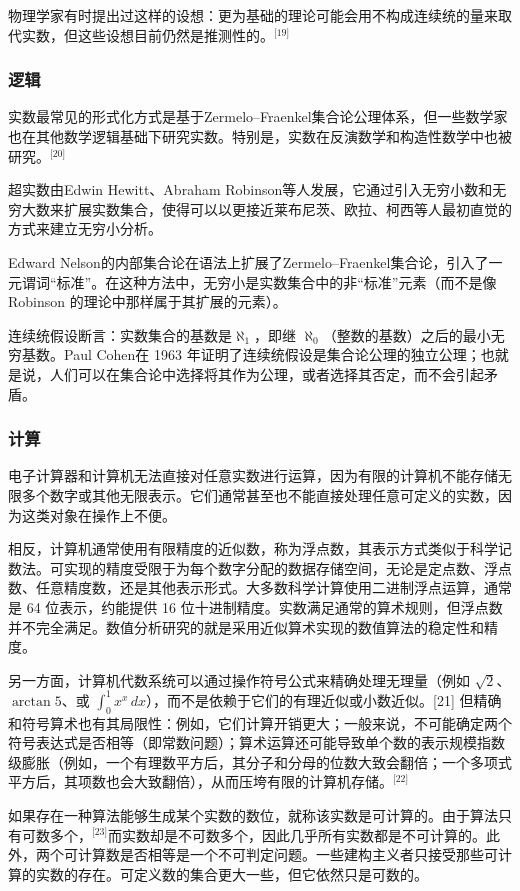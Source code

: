 物理学家有时提出过这样的设想：更为基础的理论可能会用不构成连续统的量来取代实数，但这些设想目前仍然是推测性的。\(^\text{[19]}\)
\subsubsection{逻辑}
实数最常见的形式化方式是基于Zermelo–Fraenkel集合论公理体系，但一些数学家也在其他数学逻辑基础下研究实数。特别是，实数在反演数学和构造性数学中也被研究。\(^\text{[20]}\)

超实数由Edwin Hewitt、Abraham Robinson等人发展，它通过引入无穷小数和无穷大数来扩展实数集合，使得可以以更接近莱布尼茨、欧拉、柯西等人最初直觉的方式来建立无穷小分析。

Edward Nelson的内部集合论在语法上扩展了Zermelo–Fraenkel集合论，引入了一元谓词“标准”。在这种方法中，无穷小是实数集合中的非“标准”元素（而不是像 Robinson 的理论中那样属于其扩展的元素）。

连续统假设断言：实数集合的基数是$\aleph_{1}$，即继 $\aleph_{0}$（整数的基数）之后的最小无穷基数。Paul Cohen在 1963 年证明了连续统假设是集合论公理的独立公理；也就是说，人们可以在集合论中选择将其作为公理，或者选择其否定，而不会引起矛盾。
\subsubsection{计算}
电子计算器和计算机无法直接对任意实数进行运算，因为有限的计算机不能存储无限多个数字或其他无限表示。它们通常甚至也不能直接处理任意可定义的实数，因为这类对象在操作上不便。

相反，计算机通常使用有限精度的近似数，称为浮点数，其表示方式类似于科学记数法。可实现的精度受限于为每个数字分配的数据存储空间，无论是定点数、浮点数、任意精度数，还是其他表示形式。大多数科学计算使用二进制浮点运算，通常是 64 位表示，约能提供 16 位十进制精度。实数满足通常的算术规则，但浮点数并不完全满足。数值分析研究的就是采用近似算术实现的数值算法的稳定性和精度。

另一方面，计算机代数系统可以通过操作符号公式来精确处理无理量（例如 $\sqrt{2}$、$\arctan 5$、或 $\int_{0}^{1} x^{x}\, dx$），而不是依赖于它们的有理近似或小数近似。[21] 但精确和符号算术也有其局限性：例如，它们计算开销更大；一般来说，不可能确定两个符号表达式是否相等（即常数问题）；算术运算还可能导致单个数的表示规模指数级膨胀（例如，一个有理数平方后，其分子和分母的位数大致会翻倍；一个多项式平方后，其项数也会大致翻倍），从而压垮有限的计算机存储。\(^\text{[22]}\)

如果存在一种算法能够生成某个实数的数位，就称该实数是可计算的。由于算法只有可数多个，\(^\text{[23]}\)而实数却是不可数多个，因此几乎所有实数都是不可计算的。此外，两个可计算数是否相等是一个不可判定问题。一些建构主义者只接受那些可计算的实数的存在。可定义数的集合更大一些，但它依然只是可数的。
